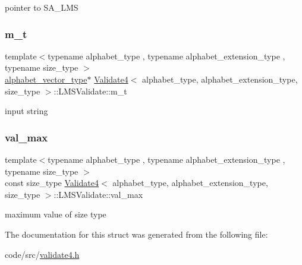 pointer to S\+A\+\_\+\+L\+MS 

\mbox{\label{struct_validate4_1_1_l_m_s_validate_a01e3da98e0c54dad32ac5b0b083e0136}} 
\subsubsection{\texorpdfstring{m\+\_\+t}{m\_t}}
{\footnotesize\ttfamily template$<$typename alphabet\+\_\+type , typename alphabet\+\_\+extension\+\_\+type , typename size\+\_\+type $>$ \\
\hyperlink{class_validate4_a49c80b3d101be19542a4341c2387603a}{alphabet\+\_\+vector\+\_\+type}$\ast$ \hyperlink{class_validate4}{Validate4}$<$ alphabet\+\_\+type, alphabet\+\_\+extension\+\_\+type, size\+\_\+type $>$\+::L\+M\+S\+Validate\+::m\+\_\+t\hspace{0.3cm}{\ttfamily [private]}}



input string 

\mbox{\label{struct_validate4_1_1_l_m_s_validate_a8dce0e079545d3c4f2649614053cf5f1}} 
\subsubsection{\texorpdfstring{val\+\_\+max}{val\_max}}
{\footnotesize\ttfamily template$<$typename alphabet\+\_\+type , typename alphabet\+\_\+extension\+\_\+type , typename size\+\_\+type $>$ \\
const size\+\_\+type \hyperlink{class_validate4}{Validate4}$<$ alphabet\+\_\+type, alphabet\+\_\+extension\+\_\+type, size\+\_\+type $>$\+::L\+M\+S\+Validate\+::val\+\_\+max\hspace{0.3cm}{\ttfamily [private]}}



maximum value of size type 



The documentation for this struct was generated from the following file\+:\begin{DoxyCompactItemize}
\item 
code/src/\hyperlink{validate4_8h}{validate4.\+h}\end{DoxyCompactItemize}
